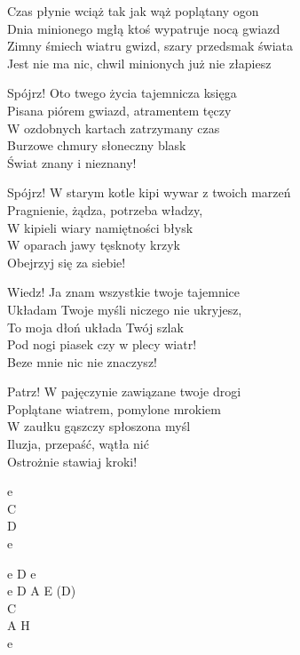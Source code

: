 \begin{text}
    \begin{smallTwo}
    \vin Czas płynie wciąż tak jak wąż poplątany ogon\\
    \vin Dnia minionego mgłą ktoś wypatruje nocą gwiazd\\
    \vin Zimny śmiech wiatru gwizd, szary przedsmak świata\\
    \vin Jest nie ma nic, chwil minionych już nie złapiesz

    Spójrz! Oto twego życia tajemnicza księga\\
    Pisana piórem gwiazd, atramentem tęczy\\
    W ozdobnych kartach zatrzymany czas\\
    Burzowe chmury  słoneczny blask\\
    Świat znany i nieznany!

    Spójrz! W starym kotle kipi wywar z twoich marzeń\\
    Pragnienie, żądza, potrzeba władzy,\\
    W kipieli wiary namiętności błysk\\
    W oparach jawy tęsknoty krzyk\\
    Obejrzyj się za siebie!

    Wiedz! Ja znam wszystkie twoje tajemnice\\
    Układam Twoje myśli niczego nie ukryjesz,\\
    To moja dłoń układa Twój szlak\\
    Pod nogi piasek czy w plecy wiatr!\\
    Beze mnie nic nie znaczysz!

    Patrz! W pajęczynie zawiązane twoje drogi\\
    Poplątane wiatrem, pomylone mrokiem\\
    W zaułku gąszczy spłoszona myśl\\
    Iluzja, przepaść, wątła nić\\
    Ostrożnie stawiaj kroki!
\end{smallTwo}
\end{text}
\begin{chord}
    \begin{smallTwo}
    e\\
    C\\
    D\\
    e

    e D e\\
    e D A E (D)\\
    C\\
    A H\\
    e
\end{smallTwo}
\end{chord}